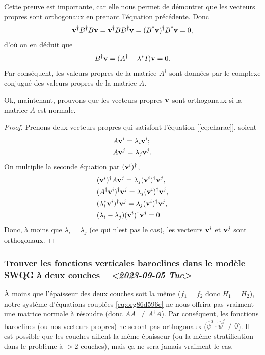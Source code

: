 \documentclass[10pt]{article}
\numberwithin{equation}{section}
\newcommand{\vv}{\vb{v}}
\begin{document}
Cette preuve est importante, car elle nous permet de démontrer que les vecteurs propres sont orthogonaux en prenant l'équation précédente.
Donc
\begin{equation}
   \vv^\dagger B^\dagger B \vv = \vv^\dagger BB^\dagger \vv = (B^\dagger \vv)^\dagger B^\dagger \vv = 0,
\end{equation}
d'où on en déduit que
\begin{equation}
   B^\dagger \vv = (A^\dagger -\lambda^* I ) \vv = 0.
\end{equation}
Par conséquent, les valeurs propres de la matrice \(A^\dagger\) sont données par le complexe conjugué des valeurs propres de la matrice \(A\). \bigskip

Ok, maintenant, prouvons que les vecteurs propres \(\vv\) sont orthogonaux si la matrice \(A\) est normale.
\begin{proof}
Prenons deux vecteurs propres qui satisfont l'équation [[eq:charac]], soient
\begin{subequations}
\begin{align}
   &A \vv^i = \lambda_i\vv^i;\\
   &A \vv^j = \lambda_j\vv^j.
\end{align}
\end{subequations}
On multiplie la seconde équation par $(\vv^i)^\dagger$,
\begin{align}
   & (\vv^i)^\dagger A\vv^j = \lambda_j(\vv^i)^\dagger\vv^j,\nonumber\\
   & (A^\dagger\vv^i)^\dagger\vv^j = \lambda_j(\vv^i)^\dagger\vv^j,\nonumber\\
   & (\lambda_i^*\vv^i)^\dagger\vv^j = \lambda_j(\vv^i)^\dagger\vv^j,\nonumber\\
   & (\lambda_i - \lambda_j) (\vv^i)^\dagger\vv^j = 0
\end{align}
Donc, à moins que $\lambda_i = \lambda_j$ (ce qui n'est pas le cas), les vecteurs $\vv^i$ et $\vv^j$ sont orthogonaux. \end{proof}

\subsubsection{Trouver les fonctions verticales baroclines dans le modèle SWQG à deux couches -- \textit{<2023-09-05 Tue>}}
\label{sec:org17f1bda}

À moins que l'épaisseur des deux couches soit la même (\(f_1 = f_2\) donc \(H_1 = H_2\)), notre système d'équations couplées \ref{eq:org86d596c} ne nous offrira pas vraiment une matrice normale à résoudre (donc \(AA^\dagger\not=A^\dagger A\)).
Par conséquent, les fonctions baroclines (ou nos vecteurs propres) ne seront pas orthogonaux (\(\hat{\psi}^i \cdot \hat{\psi}^j \not= 0\)).
Il est possible que les couches aillent la même épaisseur (ou la même stratification dans le problème à \(>2\) couches), mais ça ne sera jamais vraiment le cas.\bigskip
\end{document}

